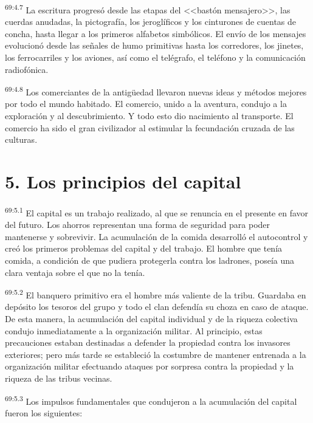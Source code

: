 \documentclass[twoside, 11pt]{book}
\begin{document}
\par
\textsuperscript{69:4.7} La escritura progresó desde las etapas del <<bastón mensajero>>, las cuerdas anudadas, la pictografía, los jeroglíficos y los cinturones de cuentas de concha, hasta llegar a los primeros alfabetos simbólicos. El envío de los mensajes evolucionó desde las señales de humo primitivas hasta los corredores, los jinetes, los ferrocarriles y los aviones, así como el telégrafo, el teléfono y la comunicación radiofónica.

\par
\textsuperscript{69:4.8} Los comerciantes de la antig\"uedad llevaron nuevas ideas y métodos mejores por todo el mundo habitado. El comercio, unido a la aventura, condujo a la exploración y al descubrimiento. Y todo esto dio nacimiento al transporte. El comercio ha sido el gran civilizador al estimular la fecundación cruzada de las culturas.

\section*{5. Los principios del capital}
\par
\textsuperscript{69:5.1} El capital es un trabajo realizado, al que se renuncia en el presente en favor del futuro. Los ahorros representan una forma de seguridad para poder mantenerse y sobrevivir. La acumulación de la comida desarrolló el autocontrol y creó los primeros problemas del capital y del trabajo. El hombre que tenía comida, a condición de que pudiera protegerla contra los ladrones, poseía una clara ventaja sobre el que no la tenía.

\par
\textsuperscript{69:5.2} El banquero primitivo era el hombre más valiente de la tribu. Guardaba en depósito los tesoros del grupo y todo el clan defendía su choza en caso de ataque. De esta manera, la acumulación del capital individual y de la riqueza colectiva condujo inmediatamente a la organización militar. Al principio, estas precauciones estaban destinadas a defender la propiedad contra los invasores exteriores; pero más tarde se estableció la costumbre de mantener entrenada a la organización militar efectuando ataques por sorpresa contra la propiedad y la riqueza de las tribus vecinas.

\par
\textsuperscript{69:5.3} Los impulsos fundamentales que condujeron a la acumulación del capital fueron los siguientes:
\end{document}
